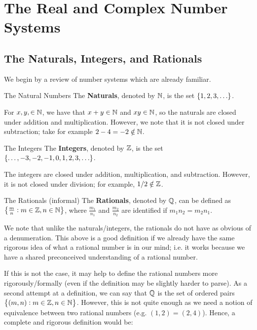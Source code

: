 \section{The Real and Complex Number Systems}
\subsection{The Naturals, Integers, and Rationals}
We begin by a review of number systems which are already familiar.

\begin{ndef}{The Natural Numbers}
    The \textbf{Naturals}, denoted by $\mathbb{N}$, is the set $\set{1, 2, 3, \ldots}$.
\end{ndef}

\noindent For $x, y, \in \mathbb{N}$, we have that $x + y \in \mathbb{N}$ and $xy \in \mathbb{N}$, so the naturals are closed under addition and multiplication. However, we note that it is not closed under subtraction; take for example $2 - 4 = -2 \notin \mathbb{N}$.

\begin{ndef}{The Integers}
    The \textbf{Integers}, denoted by $\mathbb{Z}$, is the set $\set{\ldots, -3, -2, -1, 0, 1, 2, 3, \ldots}$.
\end{ndef}

\noindent The integers are closed under addition, multiplication, and subtraction. However, it is not closed under division; for example, $1/2 \notin \mathbb{Z}$. 

\begin{ndef}{The Rationals (informal)}
    The \textbf{Rationals}, denoted by $\mathbb{Q}$, can be defined as $\set{\frac{m}{n}: m \in \mathbb{Z}, n \in \mathbb{N}}$, where $\frac{m_1}{n_1}$ and $\frac{m_2}{n_2}$ are identified if $m_1n_2 = m_2n_1$.
\end{ndef}

\noindent We note that unlike the naturals/integers, the rationals do not have as obvious of a denumeration. This above is a good definition if we already have the same rigorous idea of what a rational number is in our mind; i.e. it works because we have a shared preconceived understanding of a rational number.

If this is not the case, it may help to define the rational numbers more rigorously/formally (even if the definition may be slightly harder to parse). As a second attempt at a definition, we can say that $\mathbb{Q}$ is the set of ordered pairs $\set{(m, n): m \in \mathbb{Z}, n \in \mathbb{N}}$. However, this is not quite enough as we need a notion of equivalence between two rational numbers (e.g. $(1, 2) = (2, 4)$). Hence, a complete and rigorous definition would be:

